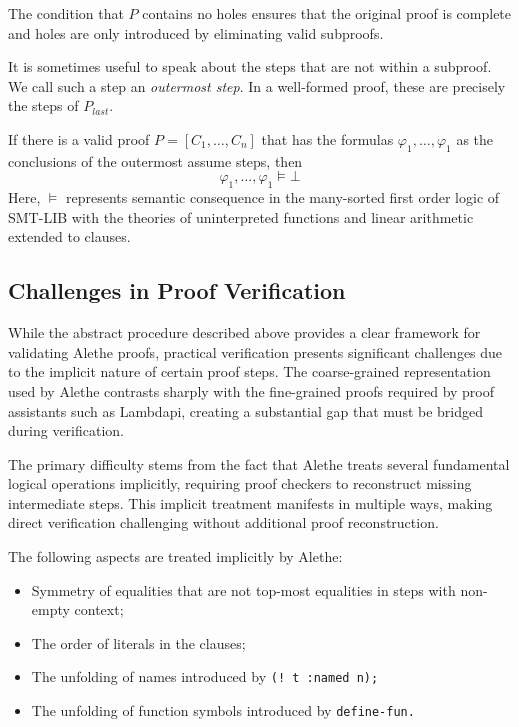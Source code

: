 The condition that $P$ contains no holes ensures that the original proof is
complete and holes are only introduced by eliminating valid subproofs.

It is sometimes useful to speak about the steps that are not within a subproof.
We call such a step an \emph{outermost step}. In a well-formed proof, these are precisely the steps of $P_{\mathit{last}}$.

\begin{theorem}
If there is a valid proof $P = [C_1, \dots , C_n]$ that has the formulas $\varphi_1, \dots, \varphi_1$ as the conclusions of the outermost assume steps, then
\[
  \varphi_1, \dots, \varphi_1 \models \bot
\]
Here, $\models$ represents semantic consequence in the many-sorted first order logic of SMT-LIB with the theories of uninterpreted functions and linear arithmetic extended to clauses.
\end{theorem}

\subsection{Challenges in Proof Verification}

While the abstract procedure described above provides a clear framework for validating Alethe proofs,
practical verification presents significant challenges due to the implicit nature of certain proof steps.
The coarse-grained representation used by Alethe contrasts sharply with the fine-grained proofs required
by proof assistants such as Lambdapi, creating a substantial gap that must be bridged during verification.

The primary difficulty stems from the fact that Alethe treats several fundamental logical operations
implicitly, requiring proof checkers to reconstruct missing intermediate steps. This implicit treatment
manifests in multiple ways, making direct verification challenging without additional proof reconstruction.

The following aspects are treated implicitly by Alethe:

\begin{itemize}
  \item Symmetry of equalities that are not top-most equalities in steps with non-empty context;
  \item The order of literals in the clauses;
  \item The unfolding of names introduced by \tt{(! t :named n)};
  \item The unfolding of function symbols introduced by \tt{define-fun}.
\end{itemize}

